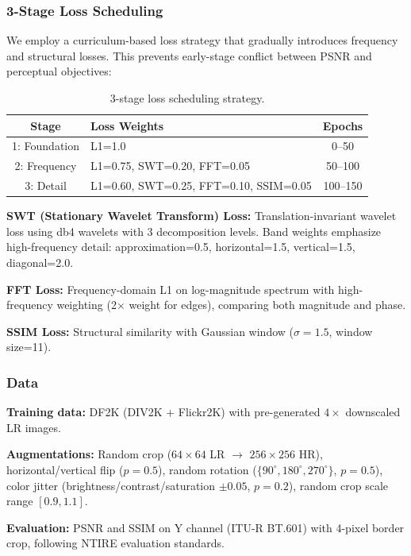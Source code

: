 \documentclass[10pt,twocolumn,letterpaper]{article}
\begin{document}
\subsubsection{3-Stage Loss Scheduling}

We employ a curriculum-based loss strategy that gradually introduces frequency and structural losses. This prevents early-stage conflict between PSNR and perceptual objectives:

\begin{table}[h]
\centering
\small
\begin{tabular}{@{}clc@{}}
\toprule
\textbf{Stage} & \textbf{Loss Weights} & \textbf{Epochs} \\
\midrule
1: Foundation & L1=1.0 & 0--50 \\
2: Frequency & L1=0.75, SWT=0.20, FFT=0.05 & 50--100 \\
3: Detail & L1=0.60, SWT=0.25, FFT=0.10, SSIM=0.05 & 100--150 \\
\bottomrule
\end{tabular}
\caption{3-stage loss scheduling strategy.}
\label{tab:loss}
\end{table}

\noindent\textbf{SWT (Stationary Wavelet Transform) Loss:} Translation-invariant wavelet loss using db4 wavelets with 3 decomposition levels. Band weights emphasize high-frequency detail: approximation=0.5, horizontal=1.5, vertical=1.5, diagonal=2.0.

\noindent\textbf{FFT Loss:} Frequency-domain L1 on log-magnitude spectrum with high-frequency weighting (2$\times$ weight for edges), comparing both magnitude and phase.

\noindent\textbf{SSIM Loss:} Structural similarity with Gaussian window ($\sigma=1.5$, window size=11).

\subsubsection{Data}

\noindent\textbf{Training data:} DF2K (DIV2K + Flickr2K) with pre-generated $4\times$ downscaled LR images.

\noindent\textbf{Augmentations:} Random crop ($64\times 64$ LR $\to$ $256\times 256$ HR), horizontal/vertical flip ($p=0.5$), random rotation ($\{90^\circ, 180^\circ, 270^\circ\}$, $p=0.5$), color jitter (brightness/contrast/saturation $\pm 0.05$, $p=0.2$), random crop scale range $[0.9, 1.1]$.

\noindent\textbf{Evaluation:} PSNR and SSIM on Y channel (ITU-R BT.601) with 4-pixel border crop, following NTIRE evaluation standards.
\end{document}
